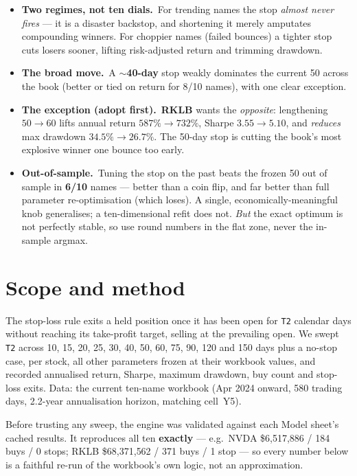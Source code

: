 \documentclass[11pt]{article}
\newcommand{\kpi}[2]{\textbf{#1}\,{\footnotesize\color{bcgrey}#2}}
\begin{document}
\begin{itemize}[leftmargin=1.4em,itemsep=2pt]
  \item \kpi{Two regimes, not ten dials.}{} For trending names the stop \emph{almost never
        fires} --- it is a disaster backstop, and shortening it merely amputates compounding
        winners. For choppier names (failed bounces) a tighter stop cuts losers sooner,
        lifting risk-adjusted return and trimming drawdown.
  \item \kpi{The broad move.}{} A \textbf{$\sim$40-day} stop weakly dominates the current 50
        across the book (better or tied on return for 8/10 names), with one clear exception.
  \item \kpi{The exception (adopt first).}{} \textbf{RKLB} wants the \emph{opposite}: lengthening
        $50\rightarrow60$ lifts annual return $587\%\rightarrow732\%$, Sharpe
        $3.55\rightarrow5.10$, and \emph{reduces} max drawdown $34.5\%\rightarrow26.7\%$. The
        50-day stop is cutting the book's most explosive winner one bounce too early.
  \item \kpi{Out-of-sample.}{} Tuning the stop on the past beats the frozen 50 out of sample in
        \textbf{6/10} names --- better than a coin flip, and far better than full parameter
        re-optimisation (which loses). A single, economically-meaningful knob generalises; a
        ten-dimensional refit does not. \emph{But} the exact optimum is not perfectly stable, so
        use round numbers in the flat zone, never the in-sample argmax.
\end{itemize}

\section{Scope and method}

The stop-loss rule exits a held position once it has been open for \texttt{T2} calendar days
without reaching its take-profit target, selling at the prevailing open. We swept
\texttt{T2} across 10, 15, 20, 25, 30, 40, 50, 60, 75, 90, 120 and 150 days plus a no-stop
case, per stock, all other
parameters frozen at their workbook values, and recorded annualised return, Sharpe, maximum
drawdown, buy count and stop-loss exits. Data: the current ten-name workbook (Apr 2024
onward, 580 trading days, 2.2-year annualisation horizon, matching cell~Y5).

Before trusting any sweep, the engine was validated against each Model sheet's cached results.
It reproduces all ten \textbf{exactly} --- e.g.\ NVDA \$6{,}517{,}886 / 184 buys / 0 stops;
RKLB \$68{,}371{,}562 / 371 buys / 1 stop --- so every number below is a faithful re-run of the
workbook's own logic, not an approximation.
\end{document}
